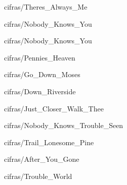 \documentclass{scrartcl}
\begin{document}

{cifras/Theres_Always_Me}


{cifras/Nobody_Knows_You}


{cifras/Nobody_Knows_You}


{cifras/Pennies_Heaven}


{cifras/Go_Down_Moses}


{cifras/Down_Riverside}


{cifras/Just_Closer_Walk_Thee}


{cifras/Nobody_Knows_Trouble_Seen}


{cifras/Trail_Lonesome_Pine}


{cifras/After_You_Gone}


{cifras/Trouble_World}

% 

% 

% 

% 
\end{document}
